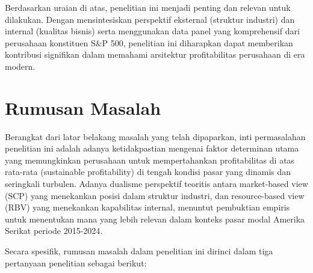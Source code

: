 \documentclass[12pt,a4paper]{report}
\begin{document}
Berdasarkan uraian di atas, penelitian ini menjadi penting dan relevan
untuk dilakukan. Dengan mensintesiskan perspektif eksternal (struktur
industri) dan internal (kualitas bisnis) serta menggunakan data panel
yang komprehensif dari perusahaan konstituen S\&P 500, penelitian ini
diharapkan dapat memberikan kontribusi signifikan dalam memahami
arsitektur profitabilitas perusahaan di era modern.

\hypertarget{rumusan-masalah}{%
\section{Rumusan Masalah}\label{rumusan-masalah}}

Berangkat dari latar belakang masalah yang telah dipaparkan, inti
permasalahan penelitian ini adalah adanya ketidakpastian mengenai faktor
determinan utama yang memungkinkan perusahaan untuk mempertahankan
profitabilitas di atas rata-rata (sustainable profitability) di tengah
kondisi pasar yang dinamis dan seringkali turbulen. Adanya dualisme
perspektif teoritis antara market-based view (SCP) yang menekankan
posisi dalam struktur industri, dan resource-based view (RBV) yang
menekankan kapabilitas internal, menuntut pembuktian empiris untuk
menentukan mana yang lebih relevan dalam konteks pasar modal Amerika
Serikat periode 2015-2024.

Secara spesifik, rumusan masalah dalam penelitian ini dirinci dalam tiga
pertanyaan penelitian sebagai berikut:
\end{document}
